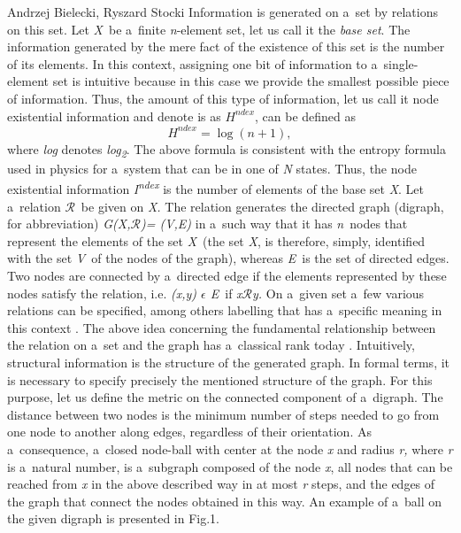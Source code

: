 \begin{artengenv2auth}{Andrzej Bielecki, Ryszard Stocki}
Information is generated on a~set by relations on this set. Let \textit{X}~be a~finite \textit{n}{}-element set, let us call it the \textit{base set}. The information generated by the mere fact of the existence of this set is the number of its elements. In this context, assigning one bit of information to a~single-element set is intuitive because in this case we provide the smallest possible piece of information. Thus, the amount of this type of information, let us call it node existential information and denote is as $H^{\textit{ndex}}$, can be defined as
\begingroup
\reqnos
\begin{equation}
H^{\textit{ndex}}=\log (n+1),
\end{equation}
\endgroup
where \textit{log} denotes \textit{log}\textit{\textsubscript{2}}. The above formula is consistent with the entropy formula used in physics for a~system that can be in one of \textit{N} states. Thus, the node existential information \textit{I}\textit{\textsuperscript{ndex}} is the number of elements of the base set \textit{X}. Let a~relation $\mathcal{R}$~be given on \textit{X.}  The relation generates the directed graph (digraph, for abbreviation) \textit{G(X,$\mathcal{R}$)= (V,E)} in a~such way that it has \textit{n}~nodes that represent the elements of the set \textit{X}~(the set \textit{X}, is therefore, simply, identified with the set \textit{V}~of the nodes of the graph), whereas \textit{E}~is the set of directed edges.  Two nodes are connected by a~directed edge if the elements represented by these nodes satisfy the relation, i.e. \textit{(x,y) $\epsilon $ E}~if \textit{x$\mathcal{R}$y.} On a~given set a~few various relations can be specified, among others labelling that has a~specific meaning in this context 
\parencite[for details see][]{bielecki_information_2022}. %
 The above idea concerning the fundamental relationship between the relation on a~set and the graph has a~classical rank today 
\parencite[][]{carnap_logische_1928}. %
 Intuitively, structural information is the structure of the generated graph. In formal terms, it is necessary to specify precisely the mentioned structure of the graph. For this purpose, let us define the metric on the connected component of a~digraph. The distance between two nodes is the minimum number of steps needed to go from one node to another along edges, regardless of their orientation. As a~consequence, a~closed node-ball with center at the node \textit{x} and radius \textit{r,} where \textit{r} is a~natural number, is a~subgraph composed of the node \textit{x}, all nodes that can be reached from \textit{x} in the above described way in at most \textit{r} steps, and the edges of the graph that connect the nodes obtained in this way. An example of a~ball on the given digraph is presented in Fig.1.



\end{artengenv2auth}
